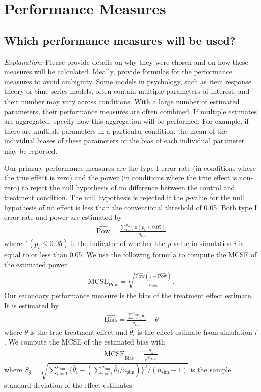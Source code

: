 \documentclass[12pt]{article}
\begin{document}
\section{Performance Measures}
\subsection{Which performance measures will be used?}
\textit{Explanation:} Please provide details on why they were chosen and on how these measures will be calculated. Ideally, provide formulas for the performance measures to avoid ambiguity. Some models in psychology, such as item response theory or time series models, often contain multiple parameters of interest, and their number may vary across conditions. With a large number of estimated parameters, their performance measures are often combined. If multiple estimates are aggregated, specify how this aggregation will be performed. For example, if there are multiple parameters in a particular condition, the mean of the individual biases of these parameters or the bias of each individual parameter may be reported.

\begin{examplebox}
Our primary performance measures are the type I error rate (in conditions where the true effect is zero) and the power (in conditions where the true effect is non-zero) to reject the null hypothesis of no difference between the control and treatment condition. The null hypothesis is rejected if the \textit{p}-value for the null hypothesis of no effect is less than the conventional threshold of 0.05. Both type I error rate and power are estimated by
\begin{align*}
   \widehat{\text{Pow}} = \frac{\sum_{i=1}^{n_{\text{sim}}} \mathbb{1}(p_i \leq 0.05)}{n_{\text{sim}}}
\end{align*}
where $\mathbb{1}(p_i \leq 0.05)$ is the indicator of whether the \textit{p}-value in simulation $i$ is equal to or less than 0.05. We use the following formula to compute the MCSE of the estimated power
\begin{align*}
    \text{MCSE}_{\widehat{\text{Pow}}} = \sqrt{\frac{\widehat{\text{Pow}} (1 - \widehat{\text{Pow}})}{n_{\text{sim}}}}.
\end{align*}
Our secondary performance measure is the bias of the treatment effect estimate. It is estimated by
\begin{align*}
   \widehat{\text{Bias}} = \frac{\sum_{i=1}^{n_{\text{sim}}} \hat{\theta}_i}{n_{\text{sim}}} - \theta
\end{align*}
where $\theta$ is the true treatment effect and $\hat{\theta}_i$ is the effect estimate from simulation $i$. We compute the MCSE of the estimated bias with
\begin{align*}
    \text{MCSE}_{\widehat{\text{Bias}}} = \frac{S_{\hat{\theta}}}{\sqrt{n_{\text{sim}}}}
\end{align*}
where $S_{\hat{\theta}} = \sqrt{\sum_{i=1}^{n_{\text{sim}}}{ \{\hat{\theta}_i - (\sum_{i=1}^{n_{\text{sim}}}\hat{\theta}_i/n_{\text{sim}})\}^2}/(n_{\text{sim}} - 1)}$ is the sample standard deviation of the effect estimates.
\end{examplebox}
\end{document}
